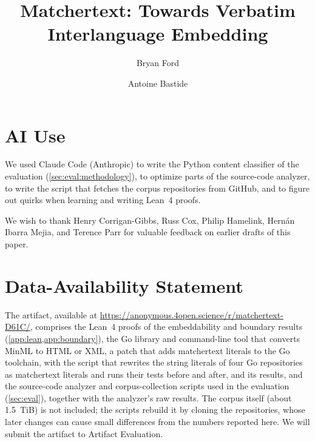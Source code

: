 \documentclass[acmsmall,screen,review,anonymous,nonacm]{acmart}
\newcommand{\xxx}[1]{}
\begin{document}
\title{Matchertext: Towards Verbatim Interlanguage Embedding}

\author{Bryan Ford}
\author{Antoine Bastide}



\maketitle











\section*{AI Use}

We used Claude Code (Anthropic) to write the Python content classifier
of the evaluation (\cref{sec:eval:methodology}),
to optimize parts of the source-code analyzer,
to write the script that fetches the corpus repositories from GitHub,
and to figure out quirks when learning and writing Lean~4 proofs.

\begin{acks}
We wish to thank
Henry Corrigan-Gibbs,
Russ Cox,
Philip Hamelink,
Hernán Ibarra Mejia,
and
Terence Parr
for valuable feedback on earlier drafts of this paper.

\xxx{samller contributions and funding acknowledgments here}
\end{acks}

\section*{Data-Availability Statement}

The artifact, available at \url{https://anonymous.4open.science/r/matchertext-D61C/}, comprises
the Lean~4 proofs of the embeddability and boundary results (\cref{app:lean,app:boundary}),
the Go library and command-line tool that converts MinML to HTML or XML,
a patch that adds matchertext literals to the Go toolchain,
with the script that rewrites the string literals of four Go repositories
as matchertext literals and runs their tests before and after, and its results,
and the source-code analyzer and corpus-collection scripts
used in the evaluation (\cref{sec:eval}),
together with the analyzer's raw results.
The corpus itself (about 1.5~TiB) is not included;
the scripts rebuild it by cloning the repositories,
whose later changes can cause small differences
from the numbers reported here.
We will submit the artifact to Artifact Evaluation.
\end{document}
